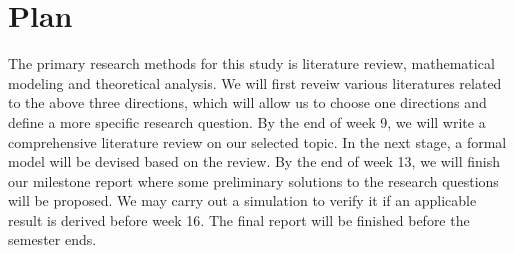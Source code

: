 \documentclass[format=acmsmall, review=false, natbib=false]{acmart}
\begin{document}
\section{Plan}

The primary research methods for this study is literature review, mathematical modeling and theoretical analysis. 
We will first reveiw various literatures related to the above three directions,
which will allow us to choose one directions and define a more specific research question. 
By the end of week 9, we will write a comprehensive literature review on our selected topic. 
In the next stage, a formal model will be devised based on the review.
By the end of week 13, we will finish our milestone report where some preliminary solutions to the research questions will be proposed. 
We may carry out a simulation to verify it if an applicable result is derived before week 16.
The final report will be finished before the semester ends.



\nocite{*}
\printbibliography
\end{document}
